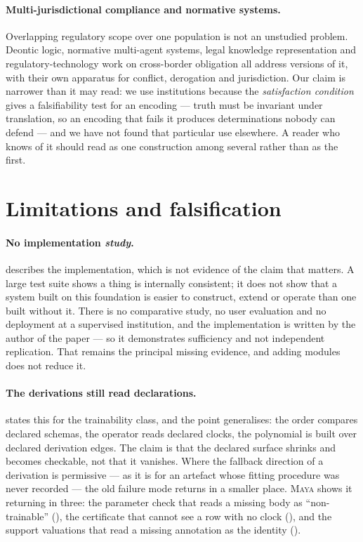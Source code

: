 \documentclass[11pt,a4paper]{article}
\renewcommand{\_}{\oldunderscore\allowbreak}
\theoremstyle{plain}
\theoremstyle{definition}
\theoremstyle{definition}
\theoremstyle{remark}
\begin{document}
\paragraph{Multi-jurisdictional compliance and normative systems.} Overlapping regulatory scope over one
population is not an unstudied problem. Deontic logic, normative multi-agent systems, legal knowledge
representation and regulatory-technology work on cross-border obligation all address versions of it, with
their own apparatus for conflict, derogation and jurisdiction. Our claim is narrower than it may read: we
use institutions \cite{goguen1992} because the \emph{satisfaction condition} gives a falsifiability test
for an encoding --- truth must be invariant under translation, so an encoding that fails it produces
determinations nobody can defend --- and we have not found that particular use elsewhere. A reader who
knows of it should read  as one construction among several rather than as the first.

\section{Limitations and falsification}\label{sec:limits}

\paragraph{No implementation \emph{study}.}  describes the implementation, which
is not evidence of the claim that matters. A large test suite shows a thing is internally
consistent; it does not show that a system built on this foundation is easier to construct, extend or
operate than one built without it. There is no comparative study, no user evaluation and no deployment at a
supervised institution, and the implementation is written by the author of the paper --- so it demonstrates
sufficiency and not independent replication. That remains the principal missing evidence, and adding modules
does not reduce it.

\paragraph{The derivations still read declarations.}  states this for the trainability
class, and the point generalises: the order compares declared schemas, the operator reads declared clocks,
the polynomial is built over declared derivation edges. The claim is that the declared surface shrinks and
becomes checkable, not that it vanishes. Where the fallback direction of a derivation is permissive --- as it
is for an artefact whose fitting procedure was never recorded --- the old failure mode returns in a smaller
place. \textsc{Maya} shows it returning in three: the parameter check that reads a missing body as
``non-trainable'' (), the certificate that cannot see a row with no clock
(), and the support valuations that read a missing annotation as the identity
().
\end{document}
